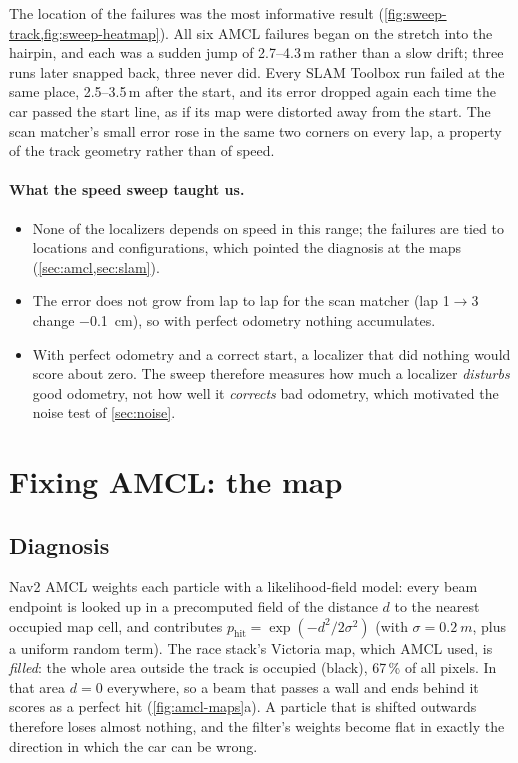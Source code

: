 \documentclass[11pt,letterpaper]{article}
\begin{document}
The location of the failures was the most informative result (\cref{fig:sweep-track,fig:sweep-heatmap}).
All six AMCL failures began on the stretch into the hairpin, and each was a sudden jump of
2.7--4.3\,m rather than a slow drift; three runs later snapped back, three never did. Every SLAM Toolbox run
failed at the same place, 2.5--3.5\,m after the start, and its error dropped again each time the
car passed the start line, as if its map were distorted away from the start. The scan matcher's
small error rose in the same two corners on every lap, a property of the track geometry rather
than of speed.

\paragraph{What the speed sweep taught us.}
\begin{itemize}[leftmargin=1.5em]
  \item None of the localizers depends on speed in this range; the failures are tied to locations
        and configurations, which pointed the diagnosis at the maps
        (\cref{sec:amcl,sec:slam}).
  \item The error does not grow from lap to lap for the scan matcher (lap 1$\to$3 change
        \SI{-0.1}{cm}), so with perfect odometry nothing accumulates.
  \item With perfect odometry and a correct start, a localizer that did nothing would score about
        zero. The sweep therefore measures how much a localizer \emph{disturbs} good odometry, not
        how well it \emph{corrects} bad odometry, which motivated the noise test of \cref{sec:noise}.
\end{itemize}

\FloatBarrier
\section{Fixing AMCL: the map}\label{sec:amcl}

\subsection{Diagnosis}

Nav2 AMCL weights each particle with a likelihood-field model: every beam endpoint is looked up in
a precomputed field of the distance $d$ to the nearest occupied map cell, and contributes
$p_\mathrm{hit}=\exp(-d^2/2\sigma^2)$ (with $\sigma=\SI{0.2}{m}$, plus a uniform random term).
The race stack's Victoria map, which AMCL used, is \emph{filled}: the whole area outside the track is
occupied (black), 67\,\% of all pixels. In that area $d=0$ everywhere, so a beam that passes a
wall and ends behind it scores as a perfect hit (\cref{fig:amcl-maps}a). A particle that is shifted
outwards therefore loses almost nothing, and the filter's weights become flat in exactly the
direction in which the car can be wrong.
\end{document}
